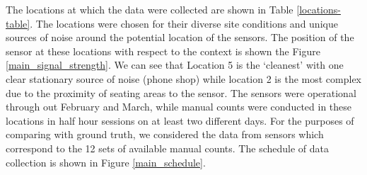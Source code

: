 The locations at which the data were collected are shown in Table
\ref{locations-table}. The locations were chosen for their diverse site
conditions and unique sources of noise around the potential location of the
sensors. The position of the sensor at these locations with respect to the
context is shown the Figure \ref{main_signal_strength}. We can see that
Location 5 is the `cleanest' with one clear stationary source of noise (phone
shop) while location 2 is the most complex due to the proximity of seating
areas to the sensor.  The sensors were operational through out February and
March, while manual counts were conducted in these locations in half hour
sessions on at least two different days. For the purposes of comparing with
ground truth, we considered the data from sensors which correspond to the 12
sets of available manual counts. The schedule of data collection is shown in
Figure \ref{main_schedule}.

